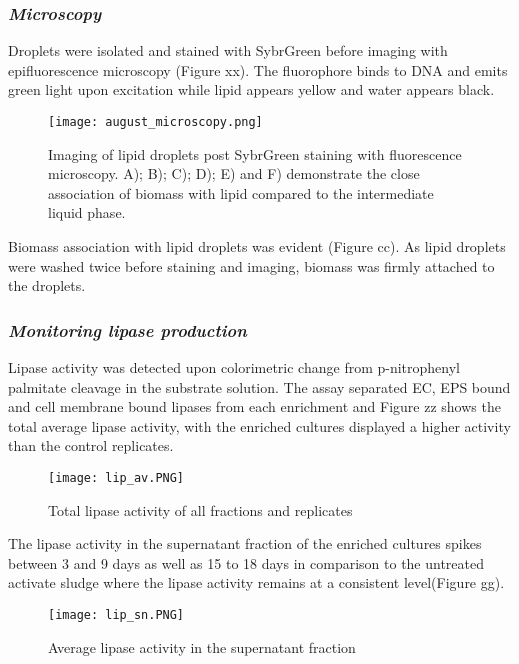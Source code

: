 \documentclass{article}
\begin{document}
\subsubsection{\emph{Microscopy}}
 Droplets were isolated and stained with SybrGreen before imaging with epifluorescence microscopy (Figure xx). The fluorophore binds to DNA and emits green light upon excitation while lipid appears yellow and water appears black.

\begin{figure}
\texttt{[image: august\_microscopy.png]}
\caption{Imaging of lipid droplets post SybrGreen staining with fluorescence microscopy. A); B); C); D); E) and F) demonstrate the close association of biomass with lipid compared to the intermediate liquid phase.}
\end{figure}


Biomass association with lipid droplets was evident (Figure cc). As lipid droplets were washed twice before staining and imaging, biomass was firmly attached to the droplets.

\subsubsection{\emph{Monitoring lipase production}}
Lipase activity was detected upon colorimetric change from p-nitrophenyl palmitate cleavage in the substrate solution. The assay separated  EC, EPS bound and cell membrane bound lipases from each enrichment and Figure zz shows the total average lipase activity, with the enriched cultures displayed a higher activity than the control replicates.
                                                                                                                                                                                                                                         

\begin{figure}
\texttt{[image: lip\_av.PNG]}
\caption{Total lipase activity of all fractions and replicates}
\end{figure}

The lipase activity in the supernatant fraction of the enriched cultures spikes between 3 and 9 days as well as 15 to 18 days in comparison to the untreated activate sludge where the lipase activity remains at a consistent level(Figure gg).

\begin{figure}
\texttt{[image: lip\_sn.PNG]}
\caption{Average lipase activity in the supernatant fraction}
\end{figure}
\end{document}
